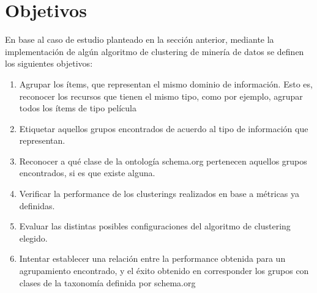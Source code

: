 \section{Objetivos}

En base al caso de estudio planteado en la sección  anterior, mediante la implementación de algún algoritmo de clustering de minería de datos 
se definen los siguientes objetivos:

\begin{enumerate}

 \item Agrupar los ítems, que representan el mismo dominio de información. Esto es, reconocer los recursos que tienen el mismo tipo,
 como por ejemplo, agrupar todos los ítems de tipo película
 
 \item Etiquetar aquellos grupos encontrados de acuerdo al tipo de información que representan.
 
 \item Reconocer a qué clase de la ontología schema.org pertenecen aquellos grupos encontrados, si es que existe alguna.
 
 \item Verificar la performance de los clusterings realizados en base a métricas ya definidas.
 
 \item Evaluar las distintas posibles configuraciones del algoritmo de clustering elegido.
 
 \item Intentar establecer una relación entre la performance obtenida para un agrupamiento encontrado, y el éxito obtenido en corresponder 
 los grupos con clases de la taxonomía definida por schema.org
 
\end{enumerate}
